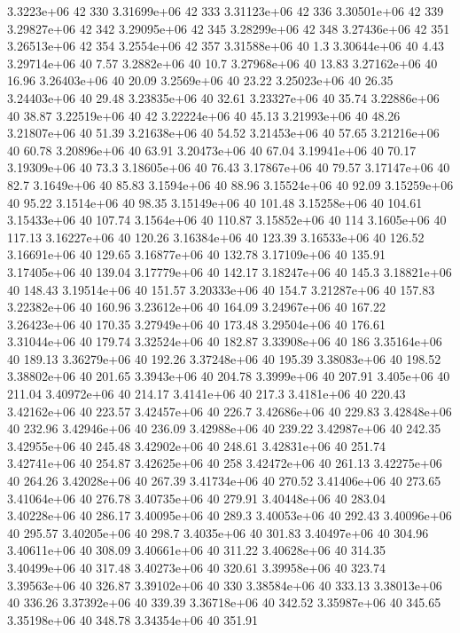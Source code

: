 3.3223e+06 42 330
3.31699e+06 42 333
3.31123e+06 42 336
3.30501e+06 42 339
3.29827e+06 42 342
3.29095e+06 42 345
3.28299e+06 42 348
3.27436e+06 42 351
3.26513e+06 42 354
3.2554e+06 42 357
3.31588e+06 40 1.3
3.30644e+06 40 4.43
3.29714e+06 40 7.57
3.2882e+06 40 10.7
3.27968e+06 40 13.83
3.27162e+06 40 16.96
3.26403e+06 40 20.09
3.2569e+06 40 23.22
3.25023e+06 40 26.35
3.24403e+06 40 29.48
3.23835e+06 40 32.61
3.23327e+06 40 35.74
3.22886e+06 40 38.87
3.22519e+06 40 42
3.22224e+06 40 45.13
3.21993e+06 40 48.26
3.21807e+06 40 51.39
3.21638e+06 40 54.52
3.21453e+06 40 57.65
3.21216e+06 40 60.78
3.20896e+06 40 63.91
3.20473e+06 40 67.04
3.19941e+06 40 70.17
3.19309e+06 40 73.3
3.18605e+06 40 76.43
3.17867e+06 40 79.57
3.17147e+06 40 82.7
3.1649e+06 40 85.83
3.1594e+06 40 88.96
3.15524e+06 40 92.09
3.15259e+06 40 95.22
3.1514e+06 40 98.35
3.15149e+06 40 101.48
3.15258e+06 40 104.61
3.15433e+06 40 107.74
3.1564e+06 40 110.87
3.15852e+06 40 114
3.1605e+06 40 117.13
3.16227e+06 40 120.26
3.16384e+06 40 123.39
3.16533e+06 40 126.52
3.16691e+06 40 129.65
3.16877e+06 40 132.78
3.17109e+06 40 135.91
3.17405e+06 40 139.04
3.17779e+06 40 142.17
3.18247e+06 40 145.3
3.18821e+06 40 148.43
3.19514e+06 40 151.57
3.20333e+06 40 154.7
3.21287e+06 40 157.83
3.22382e+06 40 160.96
3.23612e+06 40 164.09
3.24967e+06 40 167.22
3.26423e+06 40 170.35
3.27949e+06 40 173.48
3.29504e+06 40 176.61
3.31044e+06 40 179.74
3.32524e+06 40 182.87
3.33908e+06 40 186
3.35164e+06 40 189.13
3.36279e+06 40 192.26
3.37248e+06 40 195.39
3.38083e+06 40 198.52
3.38802e+06 40 201.65
3.3943e+06 40 204.78
3.3999e+06 40 207.91
3.405e+06 40 211.04
3.40972e+06 40 214.17
3.4141e+06 40 217.3
3.4181e+06 40 220.43
3.42162e+06 40 223.57
3.42457e+06 40 226.7
3.42686e+06 40 229.83
3.42848e+06 40 232.96
3.42946e+06 40 236.09
3.42988e+06 40 239.22
3.42987e+06 40 242.35
3.42955e+06 40 245.48
3.42902e+06 40 248.61
3.42831e+06 40 251.74
3.42741e+06 40 254.87
3.42625e+06 40 258
3.42472e+06 40 261.13
3.42275e+06 40 264.26
3.42028e+06 40 267.39
3.41734e+06 40 270.52
3.41406e+06 40 273.65
3.41064e+06 40 276.78
3.40735e+06 40 279.91
3.40448e+06 40 283.04
3.40228e+06 40 286.17
3.40095e+06 40 289.3
3.40053e+06 40 292.43
3.40096e+06 40 295.57
3.40205e+06 40 298.7
3.4035e+06 40 301.83
3.40497e+06 40 304.96
3.40611e+06 40 308.09
3.40661e+06 40 311.22
3.40628e+06 40 314.35
3.40499e+06 40 317.48
3.40273e+06 40 320.61
3.39958e+06 40 323.74
3.39563e+06 40 326.87
3.39102e+06 40 330
3.38584e+06 40 333.13
3.38013e+06 40 336.26
3.37392e+06 40 339.39
3.36718e+06 40 342.52
3.35987e+06 40 345.65
3.35198e+06 40 348.78
3.34354e+06 40 351.91
